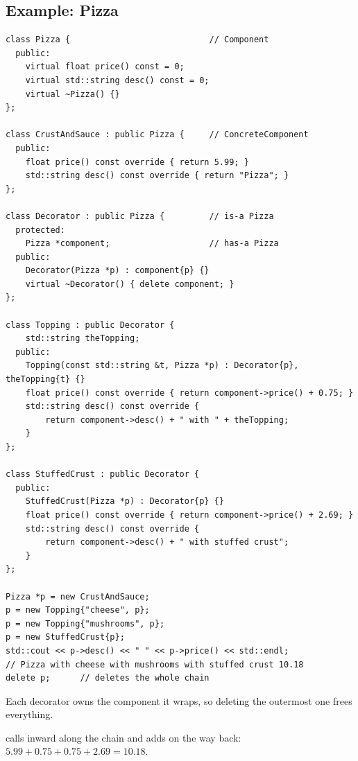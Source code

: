 \subsection{Example: Pizza}
\begin{lstlisting}[style=cpp]
class Pizza {                            // Component
  public:
    virtual float price() const = 0;
    virtual std::string desc() const = 0;
    virtual ~Pizza() {}
};

class CrustAndSauce : public Pizza {     // ConcreteComponent
  public:
    float price() const override { return 5.99; }
    std::string desc() const override { return "Pizza"; }
};

class Decorator : public Pizza {         // is-a Pizza
  protected:
    Pizza *component;                    // has-a Pizza
  public:
    Decorator(Pizza *p) : component{p} {}
    virtual ~Decorator() { delete component; }
};

class Topping : public Decorator {
    std::string theTopping;
  public:
    Topping(const std::string &t, Pizza *p) : Decorator{p}, theTopping{t} {}
    float price() const override { return component->price() + 0.75; }
    std::string desc() const override {
        return component->desc() + " with " + theTopping;
    }
};

class StuffedCrust : public Decorator {
  public:
    StuffedCrust(Pizza *p) : Decorator{p} {}
    float price() const override { return component->price() + 2.69; }
    std::string desc() const override {
        return component->desc() + " with stuffed crust";
    }
};

Pizza *p = new CrustAndSauce;
p = new Topping{"cheese", p};
p = new Topping{"mushrooms", p};
p = new StuffedCrust{p};
std::cout << p->desc() << " " << p->price() << std::endl;
// Pizza with cheese with mushrooms with stuffed crust 10.18
delete p;      // deletes the whole chain
\end{lstlisting}
Each decorator owns the component it wraps, so deleting the outermost one frees
everything.

\begin{center}

\small {} calls inward along the chain and adds on the way back:
$5.99+0.75+0.75+2.69=10.18$.
\end{center}


